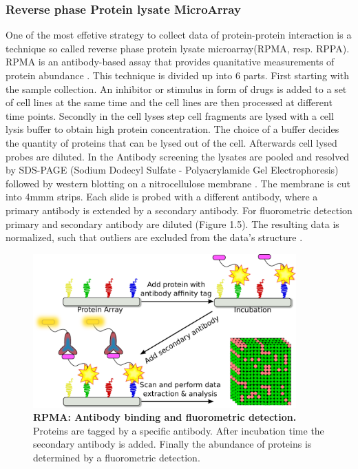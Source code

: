\subsubsection*{Reverse phase Protein lysate MicroArray}
One of the most effetive strategy to collect data of protein-protein interaction is a technique so called reverse phase protein lysate microarray(\gls{RPMA}, resp. RPPA). RPMA is an antibody-based assay that provides quanitative measurements of protein abundance \citep{authornamenotavailable.}.
This technique is divided up into 6 parts. First starting with the sample collection. An inhibitor or stimulus in form of drugs is added to a set of cell lines at the same time and the cell lines are then processed at different time points. Secondly in the cell lyses step cell fragments are lysed with a cell lysis buffer to obtain high protein concentration. The choice of a buffer decides the quantity of proteins that can be lysed out of the cell. Afterwards cell lysed probes are diluted. In the Antibody screening the lysates are pooled and resolved by \gls{SDS-PAGE} (Sodium Dodecyl Sulfate - Polyacrylamide Gel Electrophoresis) followed by western blotting on a nitrocellulose membrane \citep{AlTubuly.2000}. The membrane is cut into 4mmm strips. Each slide is probed with a different antibody, where a primary antibody is extended by a secondary antibody. For fluorometric detection primary and secondary antibody are diluted (Figure 1.5). %
The resulting data is normalized, such that outliers are excluded from the data's structure \citep{Boellner.2015}.\\

\begin{figure}
	\begin{minipage}{0.6\linewidth}
	\includegraphics[width=0.9\textwidth]{./Bilder/RPMA.pdf}
	\end{minipage}
	\caption[RPMA: Antibody binding and fluorometric detection]{\textbf{RPMA: Antibody binding and fluorometric detection.} Proteins are tagged by a specific antibody. After incubation time the secondary antibody is added. Finally the abundance of proteins is determined by a fluorometric detection.}
	\label{fig:Fig.4}
\end{figure}

